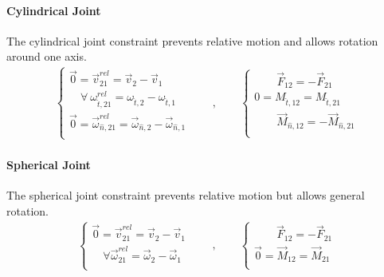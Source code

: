 \documentclass[letterpaper,10pt,english]{jupyterBook}
\begin{document}
\paragraph{Cylindrical Joint}
\label{\detokenize{ch/actions-reactions:cylindrical-joint}}
\sphinxAtStartPar
The cylindrical joint constraint prevents relative motion and allows rotation around one axis.
\begin{equation*}
\begin{split}
\begin{cases}
  \vec{0} = \vec{v}^{rel}_{21}     = \vec{v}_{2}     - \vec{v}_{1} \\
  \quad \forall \ \omega^{rel}_{\hat{t},21} = \omega_{\hat{t},2} - \omega_{\hat{t},1} \\
  \vec{0} = \vec{\omega}^{rel}_{\hat{n},21} = \vec{\omega}_{\hat{n},2} - \vec{\omega}_{\hat{n},1} \\
\end{cases}
\qquad , \qquad
\begin{cases}
  \qquad \vec{F}_{12} = - \vec{F}_{21} \\
  0 =  M_{\hat{t},12} = M_{\hat{t},21} \\
  \qquad \vec{M}_{\hat{n},12} = - \vec{M}_{\hat{n},21} \\
\end{cases}
\end{split}
\end{equation*}

\paragraph{Spherical Joint}
\label{\detokenize{ch/actions-reactions:spherical-joint}}
\sphinxAtStartPar
The spherical joint constraint prevents relative motion but allows general rotation.
\begin{equation*}
\begin{split}
\begin{cases}
  \vec{0} = \vec{v}^{rel}_{21}     = \vec{v}_{2}     - \vec{v}_{1} \\
  \quad \forall \vec{\omega}^{rel}_{21} = \vec{\omega}_{2} - \vec{\omega}_{1} \\
\end{cases}
\qquad , \qquad
\begin{cases}
  \qquad \vec{F}_{12} = - \vec{F}_{21} \\
  \vec{0} =  \vec{M}_{12} = \vec{M}_{21} \\
\end{cases}
\end{split}
\end{equation*}
\end{document}
